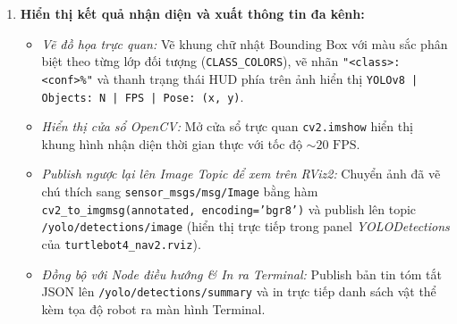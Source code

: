 \documentclass[11pt,a4paper]{article}
\begin{document}
\begin{enumerate}
\begin{itemize}
  \end{itemize}
  \item \textbf{Hiển thị kết quả nhận diện và xuất thông tin đa kênh:}
  \begin{itemize}
    \item \textit{Vẽ đồ họa trực quan:} Vẽ khung chữ nhật Bounding Box với màu sắc phân biệt theo từng lớp đối tượng (\texttt{CLASS\_COLORS}), vẽ nhãn \texttt{"<class>: <conf>\%"} và thanh trạng thái HUD phía trên ảnh hiển thị \texttt{YOLOv8 | Objects: N | FPS | Pose: (x, y)}.
    \item \textit{Hiển thị cửa sổ OpenCV:} Mở cửa sổ trực quan \texttt{cv2.imshow} hiển thị khung hình nhận diện thời gian thực với tốc độ $\sim 20\text{ FPS}$.
    \item \textit{Publish ngược lại lên Image Topic để xem trên RViz2:} Chuyển ảnh đã vẽ chú thích sang \texttt{sensor\_msgs/msg/Image} bằng hàm \texttt{cv2\_to\_imgmsg(annotated, encoding='bgr8')} và publish lên topic \texttt{/yolo/detections/image} (hiển thị trực tiếp trong panel \textit{YOLODetections} của \texttt{turtlebot4\_nav2.rviz}).
    \item \textit{Đồng bộ với Node điều hướng \& In ra Terminal:} Publish bản tin tóm tắt JSON lên \texttt{/yolo/detections/summary} và in trực tiếp danh sách vật thể kèm tọa độ robot ra màn hình Terminal.
  \end{itemize}
\end{enumerate}
\end{document}
